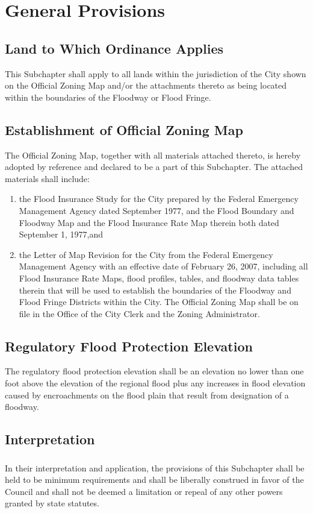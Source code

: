 \section{General Provisions}
\subsection{Land to Which Ordinance Applies}
This Subchapter shall apply to all lands within the jurisdiction of the City shown on the Official Zoning Map and/or the attachments thereto as being located within the boundaries of the Floodway or Flood Fringe.
\subsection{Establishment of Official Zoning Map}
The Official Zoning Map, together with all materials attached thereto, is hereby adopted by reference and declared to be a part of this Subchapter. The attached materials shall include:
\begin{enumerate}[{\indent}1)]
    \item the Flood Insurance Study for the City prepared by the Federal Emergency Management Agency dated September 1977, and the Flood Boundary and Floodway Map and the Flood Insurance Rate Map therein both dated September 1, 1977,and
    \item the Letter of Map Revision for the City from the Federal Emergency Management Agency with an effective date of February 26, 2007, including all Flood Insurance Rate Maps, flood profiles, tables, and floodway data tables therein that will be used to establish the boundaries of the Floodway and Flood Fringe Districts within the City. The Official Zoning Map shall be on file in the Office of the City Clerk and the Zoning Administrator.
\end{enumerate}
\subsection{Regulatory Flood Protection Elevation}
The regulatory flood protection elevation shall be an elevation no lower than one foot above the elevation of the regional flood plus any increases in flood elevation caused by encroachments on the flood plain that result from designation of a floodway.
\subsection{Interpretation}
\subsubsection{}
In their interpretation and application, the provisions of this Subchapter shall be held to be minimum requirements and shall be liberally construed in favor of the Council and shall not be deemed a limitation or repeal of any other powers granted by state statutes.
